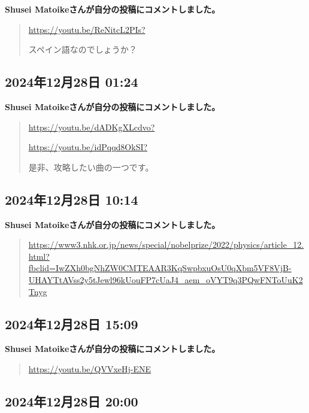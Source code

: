 \textbf{Shusei Matoikeさんが自分の投稿にコメントしました。}

\begin{quote}
\url{https://youtu.be/ReNitcL2PIs?}

スペイン語なのでしょうか？
\end{quote}

\subsection*{2024年12月28日 01:24}

\textbf{Shusei Matoikeさんが自分の投稿にコメントしました。}

\begin{quote}
\url{https://youtu.be/dADKgXLcdvo?}

\url{https://youtu.be/idPqqd8OkSI?}

是非、攻略したい曲の一つです。
\end{quote}

\subsection*{2024年12月28日 10:14}

\textbf{Shusei Matoikeさんが自分の投稿にコメントしました。}

\begin{quote}
\url{https://www3.nhk.or.jp/news/special/nobelprize/2022/physics/article_12.html?fbclid=IwZXh0bgNhZW0CMTEAAR3KqSwpbxuOsU0qXbm5VF8VjB-UHAYTtAVss2y5tJewl96kUouFP7cUaJ4_aem_oVYT9q3PQwFNToUuK2Tnyg}
\end{quote}

\subsection*{2024年12月28日 15:09}

\textbf{Shusei Matoikeさんが自分の投稿にコメントしました。}

\begin{quote}
\url{https://youtu.be/QVVxeHj-ENE}
\end{quote}

\subsection*{2024年12月28日 20:00}

